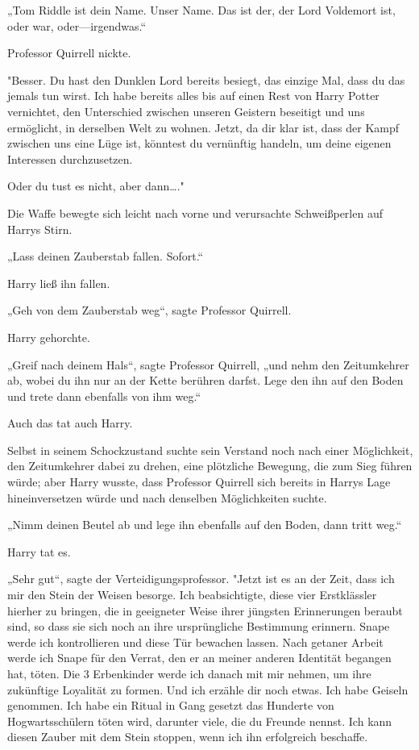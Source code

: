 {„Tom Riddle ist dein Name. Unser Name. Das ist der, der Lord Voldemort ist, oder war, oder—irgendwas.“

Professor Quirrell nickte.

"Besser. Du hast den Dunklen Lord bereits besiegt, das einzige Mal, dass du das jemals tun wirst. Ich habe bereits alles bis auf einen Rest von Harry Potter vernichtet, den Unterschied zwischen unseren Geistern beseitigt und uns ermöglicht, in derselben Welt zu wohnen. Jetzt, da dir klar ist, dass der Kampf zwischen uns eine Lüge ist, könntest du vernünftig handeln, um deine eigenen Interessen durchzusetzen.

Oder du tust es nicht, aber dann…."

Die Waffe bewegte sich leicht nach vorne und verursachte Schweißperlen auf Harrys Stirn.

„Lass deinen Zauberstab fallen. Sofort.“

Harry ließ ihn fallen.

„Geh von dem Zauberstab weg“, sagte Professor Quirrell.

Harry gehorchte.

„Greif nach deinem Hals“, sagte Professor Quirrell, „und nehm den Zeitumkehrer ab, wobei du ihn nur an der Kette berühren darfst. Lege den ihn auf den Boden und trete dann ebenfalls von ihm weg.“

Auch das tat auch Harry.

Selbst in seinem Schockzustand suchte sein Verstand noch nach einer Möglichkeit, den Zeitumkehrer dabei zu drehen, eine plötzliche Bewegung, die zum Sieg führen würde; aber Harry wusste, dass Professor Quirrell sich bereits in Harrys Lage hineinversetzen würde und nach denselben Möglichkeiten suchte.

„Nimm deinen Beutel ab und lege ihn ebenfalls auf den Boden, dann tritt weg.“

Harry tat es.

„Sehr gut“, sagte der Verteidigungsprofessor. "Jetzt ist es an der Zeit, dass ich mir den Stein der Weisen besorge. Ich beabsichtigte, diese vier Erstklässler hierher zu bringen, die in geeigneter Weise ihrer jüngsten Erinnerungen beraubt sind, so dass sie sich noch an ihre ursprüngliche Bestimmung erinnern. Snape werde ich kontrollieren und diese Tür bewachen lassen. Nach getaner Arbeit werde ich Snape für den Verrat, den er an meiner anderen Identität begangen hat, töten. Die 3 Erbenkinder werde ich danach mit mir nehmen, um ihre zukünftige Loyalität zu formen. Und ich erzähle dir noch etwas. Ich habe Geiseln genommen. Ich habe ein Ritual in Gang gesetzt das Hunderte von Hogwartsschülern töten wird, darunter viele, die du Freunde nennst. Ich kann diesen Zauber mit dem Stein stoppen, wenn ich ihn erfolgreich beschaffe.

}
